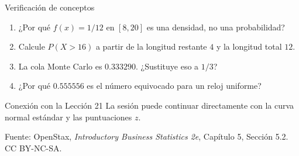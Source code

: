\documentclass[aspectratio=169,10pt,spanish]{beamer}
\begin{document}
\begin{frame}{Verificación de conceptos}
  \begin{enumerate}
    \item ¿Por qué $f(x)=1/12$ en $[8,20]$ es una densidad, no una probabilidad?
    \item Calcule $P(X>16)$ a partir de la longitud restante $4$ y la longitud total $12$.
    \item La cola Monte Carlo es $0.333290$. ¿Sustituye eso a $1/3$?
    \item ¿Por qué $0.555556$ es el número equivocado para un reloj uniforme?
  \end{enumerate}

  \vspace{0.6em}
  \begin{block}{Conexión con la Lección 21}
    La sesión puede continuar directamente con la curva normal estándar y las
    puntuaciones $z$.
  \end{block}

  \vfill
  \scriptsize Fuente: OpenStax, \textit{Introductory Business Statistics 2e},
  Capítulo 5, Sección 5.2. CC BY-NC-SA.
\end{frame}

\appendix
\end{document}
